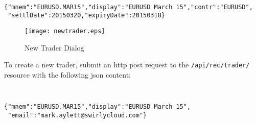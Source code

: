 \documentclass[11pt,a4paper]{article}
\begin{document}
{\tt\small
\begin{verbatim}
{"mnem":"EURUSD.MAR15","display":"EURUSD March 15","contr":"EURUSD",
 "settlDate":20150320,"expiryDate":20150318}
\end{verbatim}
}

\begin{figure}[H]
\centering
\texttt{[image: newtrader.eps]}
\caption{New Trader Dialog}
\end{figure}

To create a new trader, submit an \gls{http} post request to the \texttt{/api/rec/trader/} resource
with the following \gls{json} content:

{\tt\small
\begin{verbatim}
{"mnem":"EURUSD.MAR15","display":"EURUSD March 15",
 "email":"mark.aylett@swirlycloud.com"}
\end{verbatim}
}
\end{document}
